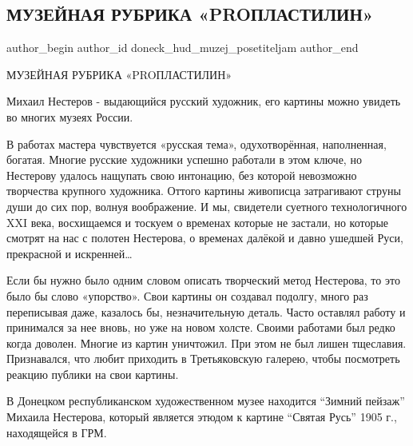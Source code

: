  
 
 
 
 
\subsection{МУЗЕЙНАЯ РУБРИКА «PROПЛАСТИЛИН»}
\label{sec:07_01_2022.vk.doneck_hud_muzej_posetiteljam.1.rubrika_pro_plastilin}

\ifcmt
 author_begin
   author_id doneck_hud_muzej_posetiteljam
 author_end
\fi

МУЗЕЙНАЯ РУБРИКА «PROПЛАСТИЛИН»

Михаил Нестеров - выдающийся русский художник, его картины можно увидеть во
многих музеях России.


В работах мастера чувствуется «русская тема», одухотворённая, наполненная,
богатая. Многие русские художники успешно работали в этом ключе, но Нестерову
удалось нащупать свою интонацию, без которой невозможно творчества крупного
художника. Оттого картины живописца затрагивают струны души до сих пор, волнуя
воображение. И мы, свидетели суетного технологичного XXI века, восхищаемся и
тоскуем о временах которые не застали, но которые смотрят на нас с полотен
Нестерова, о временах далёкой и давно ушедшей Руси, прекрасной и искренней…

Если бы нужно было одним словом описать творческий метод Нестерова, то это было
бы слово «упорство». Свои картины он создавал подолгу, много раз переписывая
даже, казалось бы, незначительную деталь. Часто оставлял работу и принимался за
нее вновь, но уже на новом холсте. Своими работами был редко когда доволен.
Многие из картин уничтожил. При этом не был лишен тщеславия. Признавался, что
любит приходить в Третьяковскую галерею, чтобы посмотреть реакцию публики на
свои картины.

В Донецком республиканском художественном музее находится \enquote{Зимний
пейзаж} Михаила Нестерова, который является этюдом к картине \enquote{Святая
Русь} 1905 г., находящейся в ГРМ.


